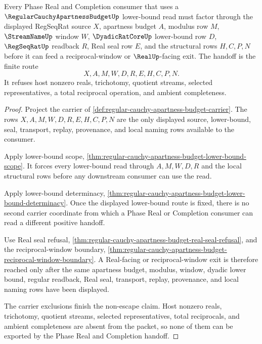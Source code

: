 \begin{theorem}
\label{thm:regular-cauchy-apartness-budget-phase-real-handoff}
Every Phase Real and Completion consumer that uses a $\RegularCauchyApartnessBudgetUp$ lower-bound read must factor through the displayed RegSeqRat source $X$, apartness budget $A$, modulus row $M$, $\StreamNameUp$ window $W$, $\DyadicRatCoreUp$ lower-bound row $D$, $\RegSeqRatUp$ readback $R$, Real seal row $E$, and the structural rows $H,C,P,N$ before it can feed a reciprocal-window or $\RealUp$-facing exit. The handoff is the finite route
$$
X,A,M,W,D,R,E,H,C,P,N .
$$
It refuses host nonzero reals, trichotomy, quotient streams, selected representatives, a total reciprocal operation, and ambient completeness.
\end{theorem}
\begin{proof}
Project the carrier of \autoref{def:regular-cauchy-apartness-budget-carrier}. The rows $X,A,M,W,D,R,E,H,C,P,N$ are the only displayed source, lower-bound, seal, transport, replay, provenance, and local naming rows available to the consumer.

Apply lower-bound scope, \autoref{thm:regular-cauchy-apartness-budget-lower-bound-scope}. It forces every lower-bound read through $A,M,W,D,R$ and the local structural rows before any downstream consumer can use the read.

Apply lower-bound determinacy, \autoref{thm:regular-cauchy-apartness-budget-lower-bound-determinacy}. Once the displayed lower-bound route is fixed, there is no second carrier coordinate from which a Phase Real or Completion consumer can read a different positive handoff.

Use Real seal refusal, \autoref{thm:regular-cauchy-apartness-budget-real-seal-refusal}, and the reciprocal-window boundary, \autoref{thm:regular-cauchy-apartness-budget-reciprocal-window-boundary}. A Real-facing or reciprocal-window exit is therefore reached only after the same apartness budget, modulus, window, dyadic lower bound, regular readback, Real seal, transport, replay, provenance, and local naming rows have been displayed.

The carrier exclusions finish the non-escape claim. Host nonzero reals, trichotomy, quotient streams, selected representatives, total reciprocals, and ambient completeness are absent from the packet, so none of them can be exported by the Phase Real and Completion handoff.
\end{proof}

